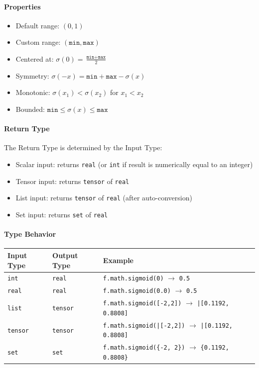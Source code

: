 \paragraph{Properties}
\begin{itemize}
\item Default range: $(0, 1)$
\item Custom range: $(\texttt{min}, \texttt{max})$
\item Centered at: $\sigma(0) = \frac{\texttt{min} + \texttt{max}}{2}$
\item Symmetry: $\sigma(-x) = \texttt{min} + \texttt{max} - \sigma(x)$
\item Monotonic: $\sigma(x_1) < \sigma(x_2)$ for $x_1 < x_2$
\item Bounded: $\texttt{min} \leq \sigma(x) \leq \texttt{max}$
\end{itemize}

\paragraph{Return Type}
The Return Type is determined by the Input Type:
\begin{itemize}
\item Scalar input: returns \texttt{real} (or \texttt{int} if result is numerically equal to an integer)
\item Tensor input: returns \texttt{tensor} of \texttt{real}
\item List input: returns \texttt{tensor} of \texttt{real} (after auto-conversion)
\item Set input: returns \texttt{set} of \texttt{real}
\end{itemize}

\paragraph{Type Behavior}
\begin{center}
\begin{tabular}{lll}
\textbf{Input Type} & \textbf{Output Type} & \textbf{Example} \\ \hline
\texttt{int} & \texttt{real} & \texttt{f.math.sigmoid(0)} $\to$ \texttt{0.5} \\
\texttt{real} & \texttt{real} & \texttt{f.math.sigmoid(0.0)} $\to$ \texttt{0.5} \\
\texttt{list} & \texttt{tensor} & \texttt{f.math.sigmoid([-2,2])} $\to$ \texttt{|[0.1192, 0.8808]} \\
\texttt{tensor} & \texttt{tensor} & \texttt{f.math.sigmoid(|[-2,2])} $\to$ \texttt{|[0.1192, 0.8808]} \\
\texttt{set} & \texttt{set} & \texttt{f.math.sigmoid(\{-2, 2\})} $\to$ \texttt{\{0.1192, 0.8808\}} \\
\end{tabular}
\end{center}

